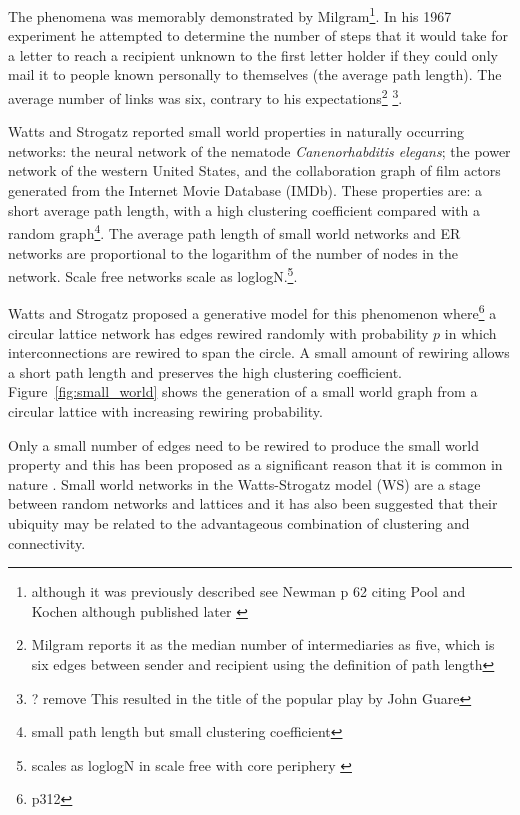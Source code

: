 The phenomena was memorably demonstrated by Milgram\cite{milgram1967small}\footnote{although it was previously described see Newman \cite{newman2018networks}
p 62 citing Pool and Kochen although published later \cite{de1978contacts} }. In his 1967 experiment he attempted to determine the number of steps that it would take for a letter to reach a recipient unknown to the first letter holder if they could only mail it to people known personally to themselves (the average path length). The average number of links was six, contrary to his expectations\footnote{Milgram reports it as the median number of intermediaries as five, which is six edges between sender and recipient using the definition of path length} \footnote{? remove This resulted in the title of the popular play by John Guare}. 

Watts and Strogatz \cite{watts1998collective} reported small world properties in naturally occurring networks: the neural network of the nematode \textit{Canenorhabditis elegans}; the power network of the western United States, and the collaboration graph of film actors generated from the Internet Movie Database (IMDb). These properties are: a short average path length, with a high clustering coefficient compared with a random graph\footnote{small path length but small clustering coefficient}. The average path length of small world networks and ER networks are proportional to the logarithm of the number of nodes in the network. Scale free networks scale as loglogN\cite{cohen2003scale}.\footnote{scales as loglogN in scale free with core periphery \cite{boccaletti2006complex}}. 

Watts and Strogatz\cite{watts1998collective} proposed a generative model for this phenomenon where\cite{newman2018networks}\footnote{p312} a circular lattice network has edges rewired randomly with probability $p$ in which interconnections are rewired to span the circle. A small amount of rewiring allows a short path length and preserves the high clustering coefficient. Figure~\ref{fig:small_world} shows the generation of a small world graph from a circular lattice with increasing rewiring probability.

Only a small number of edges need to be rewired to produce the small world property and this has been proposed as a significant reason that it is common in nature \cite{newman2018networks}. Small world networks in the Watts-Strogatz model (WS) are a stage between random networks and lattices and it has also been suggested that their ubiquity may be related to the advantageous combination of clustering and connectivity\cite{latora2001efficient}.

